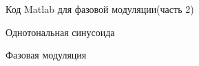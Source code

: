 \documentclass[12pt,a4paper]{scrartcl}
\begin{document}
\begin{figure}[h!]
\caption{Код Matlab для фазовой модуляции(часть 2)}
\end{figure}

\begin{figure}[h!]
\caption{Однотональная синусоида}
\end{figure}

\begin{figure}[h!]
\caption{Фазовая модуляция}
\end{figure}
\end{document}
